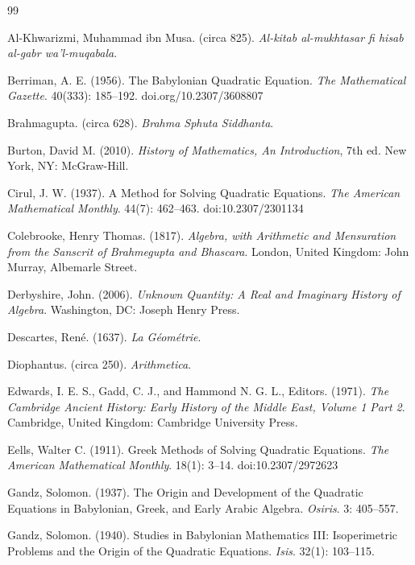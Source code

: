 \documentclass[11pt]{article}
\begin{document}
\begin{thebibliography}{99}

   Al-Khwarizmi, Muhammad ibn Musa. (circa 825).
    \emph{Al-kitab al-mukhtasar fi hisab al-gabr wa'l-muqabala}.

   Berriman, A. E. (1956). The Babylonian Quadratic
    Equation.  \emph{The Mathematical Gazette}. 40(333): 185--192.
    doi.org/10.2307/3608807

   Brahmagupta. (circa 628). \emph{Brahma Sphuta
    Siddhanta}.

   Burton, David M. (2010). \emph{History of Mathematics,
    An Introduction}, 7th ed. New York, NY: McGraw-Hill.

   Cirul, J. W. (1937). A Method for Solving Quadratic
    Equations. \emph{The American Mathematical Monthly}. 44(7): 462--463.
    doi:10.2307/2301134

   Colebrooke, Henry Thomas. (1817). \emph{Algebra,
    with Arithmetic and Mensuration from the Sanscrit of Brahmegupta and
  Bhascara}. London, United Kingdom: John Murray, Albemarle Street.

   Derbyshire, John. (2006). \emph{Unknown Quantity: A
    Real and Imaginary History of Algebra}. Washington, DC: Joseph Henry
    Press.

   Descartes, Ren\'e. (1637). \emph{La G\'eom\'etrie}.

   Diophantus. (circa 250). \emph{Arithmetica}.

   Edwards, I. E. S., Gadd, C. J., and Hammond N.
    G. L., Editors. (1971). \emph{The Cambridge Ancient History: Early
    History of the Middle East, Volume 1 Part 2}. Cambridge, United
    Kingdom: Cambridge University Press.

   Eells, Walter C. (1911). Greek Methods of Solving
    Quadratic Equations. \emph{The American Mathematical Monthly}.
    18(1): 3--14. doi:10.2307/2972623

   Gandz, Solomon. (1937). The Origin and Development
    of the Quadratic Equations in Babylonian, Greek, and Early Arabic
    Algebra. \emph{Osiris}. 3: 405--557.

   Gandz, Solomon. (1940). Studies in Babylonian
    Mathematics III: Isoperimetric Problems and the Origin of the Quadratic
    Equations. \emph{Isis}. 32(1): 103--115.


\end{thebibliography}
\end{document}
